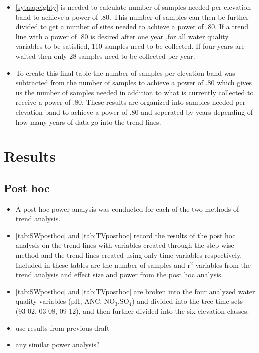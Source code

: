 \begin{itemize}
	\item \autoref{sytaapeighty} is needed to calculate number of samples needed per elevation band to achieve a power of .80.  This number of samples can then be further divided to get a number of sites needed to achieve a power of .80.  If a trend line with a power of .80 is desired after one year ,for all water quality variables to be satisfied, 110 samples need to be collected.  If four years are waited then only 28 samples need to be collected per year.
	\item  To create this final table the number of samples per elevation  band was subtracted from the number of samples to achieve a power of .80 which gives us the number of samples needed in addition to what is currently collected to receive a power of .80.  These results are organized into samples needed per elevation band to achieve a power of .80 and seperated by years depending of how many years of data go into the trend lines.
\end{itemize}



\section{Results}
\subsection{Post hoc}
\begin{itemize}
	\item A post hoc power analysis was conducted for each of the two methods of trend analysis.
	\item \autoref{tab:SWposthoc} and \autoref{tab:TVposthoc} record the results of the post hoc analysis on the trend lines with variables created through the step-wise method and the trend lines created using only time variables respectively.  Included in these tables are the number of samples and r$^2$ variables from the trend analysis and effect size and power from the post hoc analysis.
	\item \autoref{tab:SWposthoc} and \autoref{tab:TVposthoc} are broken into the four analyzed water quality variables (pH, ANC, NO$_3$,SO$_4$) and divided into the tree time sets (93-02, 03-08, 09-12), and then further divided into the six elevation classes.
	\item use results from previous draft
	\item any similar power analysis?
\end{itemize}
